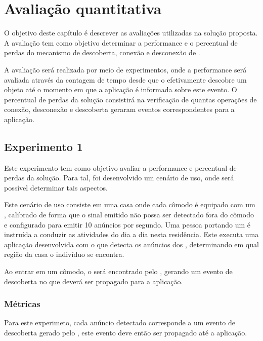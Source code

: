 \chapter{Avaliação quantitativa}\label{chap:avaliacao}

O objetivo deste capítulo é descrever as avaliações utilizadas na solução proposta. A avaliação tem como objetivo determinar a performance e o percentual de perdas do mecanismo de descoberta, conexão e desconexão de \smartobjs.

A avaliação será realizada por meio de experimentos, onde a performance será avaliada através da contagem de tempo desde que o \mhub efetivamente descobre um objeto até o momento em que a aplicação é informada sobre este evento. O percentual de perdas da solução consistirá na verificação de quantas operações de conexão, desconexão e descoberta geraram eventos correspondentes para a aplicação.

\section{Experimento 1}\label{chap:avaliacao-experimento1}

Este experimento tem como objetivo avaliar a performance e percentual de perdas da solução. Para tal, foi desenvolvido um cenário de uso, onde será possível determinar tais aspectos.

Este cenário de uso consiste em uma casa onde cada cômodo é equipado com um \beacon \ble, calibrado de forma que o sinal emitido não possa ser detectado fora do cômodo e configurado para emitir 10 anúncios por segundo. Uma pessoa portando um \smartphone é instruída a conduzir as atividades do dia a dia nesta residência. Este \smartphone executa uma aplicação desenvolvida com o \middleware \mhubcddl que detecta os anúncios dos \beacons, determinando em qual região da casa o indivíduo se encontra.

Ao entrar em um cômodo, o \beacon será encontrado pelo \mhubcddl, gerando um evento de descoberta no \stwopa que deverá ser propagado para a aplicação.

\subsection{Métricas}

Para este experimeto, cada anúncio detectado corresponde a um evento de descoberta gerado pelo \stwopa, este evento deve então ser propagado até a aplicação.

